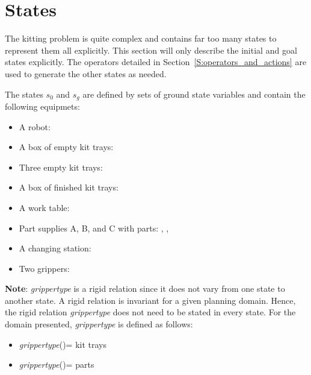 \section{States}


The kitting problem is quite complex and contains far too many states to represent them all explicitly. This section will only describe the initial and goal states explicitly. The operators detailed in Section~\ref{S:operators_and_actions} are used to generate the other states as needed.

The states $s_0$ and $s_g$ are defined by sets of ground state variables and contain the following equipmets:
\begin {itemize}
\item A robot: 
\item A box of empty kit trays: 
\item Three empty kit trays: 
\item A box of finished kit trays: 
\item A work table: 
\item Part supplies A, B, and C with parts: , , 
\item A changing station: 
\item Two grippers: 
\end {itemize}



\textbf{Note}: \textit{grippertype} is a rigid relation since it does not vary from one state to another state. A rigid relation is invariant for a given planning domain. Hence, the rigid relation \textit{grippertype} does not need to be stated in every state. For the domain presented, \textit{grippertype} is defined as follows:

\begin{itemize}
 \item \textit{grippertype}()= kit trays
 \item \textit{grippertype}()= parts
\end{itemize}



